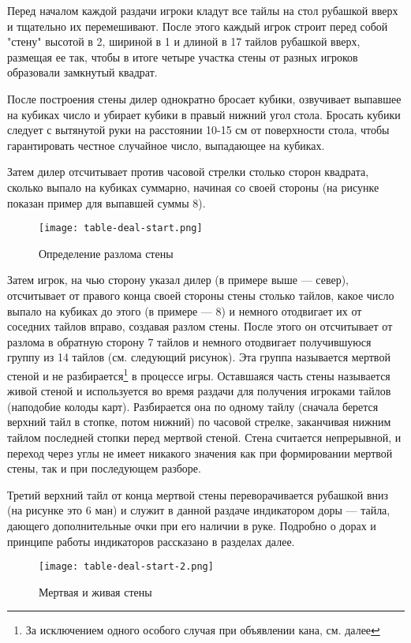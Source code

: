 Перед началом каждой раздачи игроки кладут все тайлы на стол рубашкой вверх и тщательно их перемешивают. После этого каждый игрок строит перед собой "стену" высотой в 2, шириной в 1 и длиной в 17 тайлов рубашкой вверх, размещая ее так, чтобы в итоге четыре участка стены от разных игроков образовали замкнутый квадрат.

После построения стены дилер однократно бросает кубики, озвучивает выпавшее на кубиках число и убирает кубики в правый нижний угол стола. Бросать кубики следует с вытянутой руки на расстоянии 10-15 см от поверхности стола, чтобы гарантировать честное случайное число, выпадающее на кубиках.

Затем дилер отсчитывает против часовой стрелки столько сторон квадрата, сколько выпало на кубиках суммарно, начиная со своей стороны (на рисунке показан пример для выпавшей суммы 8).

\begin{figure}[H]
	\centering
	\texttt{[image: table-deal-start.png]}
	\caption{Определение разлома стены}
\end{figure}

Затем игрок, на чью сторону указал дилер (в примере выше --- север), отсчитывает от правого конца своей стороны стены столько тайлов, какое число выпало на кубиках до этого (в примере --- 8) и немного отодвигает их от соседних тайлов вправо, создавая разлом стены. После этого он отсчитывает от разлома в обратную сторону 7 тайлов и немного отодвигает получившуюся группу из 14 тайлов (см. следующий рисунок). Эта группа называется мертвой стеной и не разбирается\footnote{За исключением одного особого случая при объявлении кана, см. далее} в процессе игры. Оставшаяся часть стены называется живой стеной и используется во время раздачи для получения игроками тайлов (наподобие колоды карт). Разбирается она по одному тайлу (сначала берется верхний тайл в стопке, потом нижний) по часовой стрелке, заканчивая нижним тайлом последней стопки перед мертвой стеной. Стена считается непрерывной, и переход через углы не имеет никакого значения как при формировании мертвой стены, так и при последующем разборе.

Третий верхний тайл от конца мертвой стены переворачивается рубашкой вниз (на рисунке это 6 ман) и служит в данной раздаче индикатором доры --- тайла, дающего дополнительные очки при его наличии в руке. Подробно о дорах и принципе работы индикаторов рассказано в разделах далее.

\begin{figure}[H]
	\centering
	\texttt{[image: table-deal-start-2.png]}
	\caption{Мертвая и живая стены}
\end{figure}

